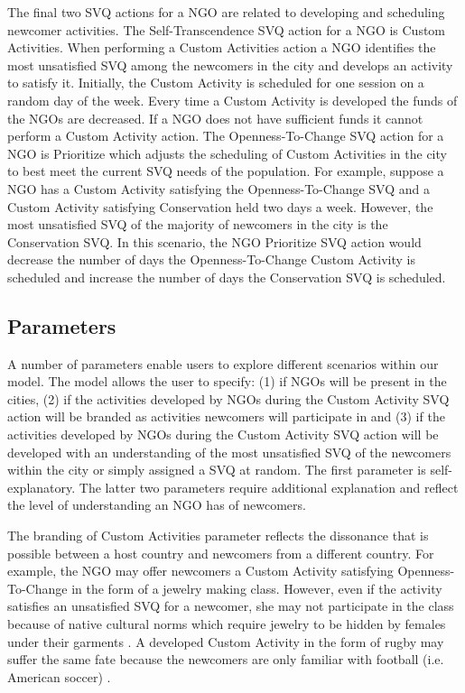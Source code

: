 \documentclass{scspaperproc}
\theoremstyle{scsthe}
\begin{document}
The final two SVQ actions for a NGO are related to developing and scheduling newcomer activities. The Self-Transcendence SVQ action for a NGO is Custom Activities. When performing a Custom Activities action a NGO identifies the most unsatisfied SVQ among the newcomers in the city and develops an activity to satisfy it. Initially, the Custom Activity is scheduled for one session on a random day of the week. Every time a Custom Activity is developed the funds of the NGOs are decreased. If a NGO does not have sufficient funds it cannot perform a Custom Activity action. The Openness-To-Change SVQ action for a NGO is Prioritize which adjusts the scheduling of Custom Activities in the city to best meet the current SVQ needs of the population. For example, suppose a NGO has a Custom Activity satisfying the Openness-To-Change SVQ and a Custom Activity satisfying Conservation held two days a week. However, the most unsatisfied SVQ of the majority of newcomers in the city is the Conservation SVQ. In this scenario, the NGO Prioritize SVQ action would decrease the number of days the Openness-To-Change Custom Activity is scheduled and increase the number of days the Conservation SVQ is scheduled.

\subsection{Parameters}
A number of parameters enable users to explore different scenarios within our model. The model allows the user to specify: (1) if NGOs will be present in the cities, (2) if the activities developed by NGOs during the Custom Activity SVQ action will be branded as activities newcomers will participate in and (3) if the activities developed by NGOs during the Custom Activity SVQ action will be developed with an understanding of the most unsatisfied SVQ of the newcomers within the city or simply assigned a SVQ at random. The first parameter is self-explanatory. The latter two parameters require additional explanation and reflect the level of understanding an NGO has of newcomers. 

The branding of Custom Activities parameter reflects the dissonance that is possible between a host country and newcomers from a different country. For example, the NGO may offer newcomers a Custom Activity satisfying Openness-To-Change in the form of a jewelry making class. However, even if the activity satisfies an unsatisfied SVQ for a newcomer, she may not participate in the class because of native cultural norms which require jewelry to be hidden by females under their garments \cite{rublee1991constraints}. A developed Custom Activity in the form of rugby may suffer the same fate because the newcomers are only familiar with football (i.e. American soccer) \cite{guest2009diffusion}. 
\end{document}
